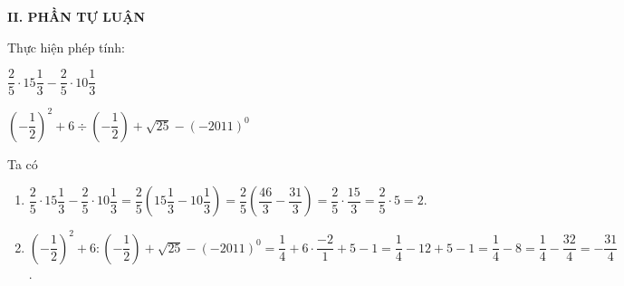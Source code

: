 	\noindent\textbf{II. PHẦN TỰ LUẬN}
	\setcounter{ex}{0}
		\begin{ex}%
			Thực hiện phép tính:
			\begin{listEX}[2]
				\item $\dfrac{2}{5}\cdot 15\dfrac{1}{3}-\dfrac{2}{5}\cdot 10\dfrac{1}{3}$
				\item $\left( -\dfrac{1}{2}\right)^2 +6\div \left( -\dfrac{1}{2}\right) + \sqrt{25}- \left( -2011 \right) ^0$
			\end{listEX}
			\loigiai
			{
				Ta có
				\begin{enumerate}
					\item 
								$\dfrac{2}{5}\cdot 15\dfrac{1}{3}-\dfrac{2}{5}\cdot 10\dfrac{1}{3}
								=\dfrac{2}{5}\left( 15\dfrac{1}{3}-10\dfrac{1}{3}\right)
								=\dfrac{2}{5}\left( \dfrac{46}{3}-\dfrac{31}{3}\right)
								=\dfrac{2}{5}\cdot \dfrac{15}{3}
								=\dfrac{2}{5}\cdot 5
								=2$.
					\item 
								$\left( -\dfrac{1}{2}\right)^2 +6 : \left( -\dfrac{1}{2}\right) + \sqrt{25}- \left( -2011 \right) ^0
								=\dfrac{1}{4}+6\cdot \dfrac{-2}{1}+5-1
								=\dfrac{1}{4}-12+5-1
								=\dfrac{1}{4}-8
								=\dfrac{1}{4}-\dfrac{32}{4}
								=-\dfrac{31}{4}$.	
				\end{enumerate}
			}
		\end{ex}
		
